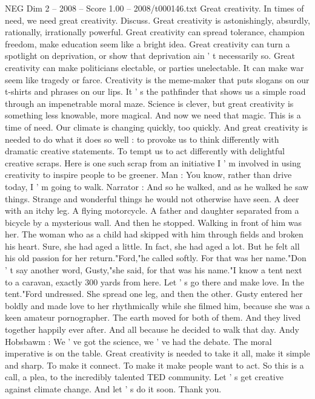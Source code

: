 \begin{textsample}{NEG Dim 2 – 2008 – Score 1.00 – 2008/t000146.txt}  \label{ex:f2_neg_023}
Great creativity.
In times of need, we need great creativity.
Discuss.
Great creativity is astonishingly, absurdly, rationally, irrationally powerful.
Great creativity can spread tolerance, champion freedom, make education seem like a bright idea.
Great creativity can turn a spotlight on deprivation, or show that deprivation ain ' t necessarily so.
Great creativity can make politicians electable, or parties unelectable.
It can make war seem like tragedy or farce.
Creativity is the meme-maker that puts slogans on our t-shirts and phrases on our lips.
It ' s the pathfinder that shows us a simple road through an impenetrable moral maze.
Science is clever, but great creativity is something less knowable, more magical.
And now we need that magic.
This is a time of need.
Our climate is changing quickly, too quickly.
And great creativity is needed to do what it does so well : to provoke us to think differently with dramatic creative statements.
To tempt us to act differently with delightful creative scraps.
Here is one such scrap from an initiative I ' m involved in using creativity to inspire people to be greener.
Man : You know, rather than drive today, I ' m going to walk.
Narrator : And so he walked, and as he walked he saw things.
Strange and wonderful things he would not otherwise have seen.
A deer with an itchy leg.
A flying motorcycle.
A father and daughter separated from a bicycle by a mysterious wall.
And then he stopped.
Walking in front of him was her.
The woman who as a child had skipped with him through fields and broken his heart.
Sure, she had aged a little.
In fact, she had aged a lot.
But he felt all his old passion for her return."Ford,"he called softly.
For that was her name."Don ' t say another word, Gusty,"she said, for that was his name."I know a tent next to a caravan, exactly 300 yards from here.
Let ' s go there and make love.
In the tent."Ford undressed.
She spread one leg, and then the other.
Gusty entered her boldly and made love to her rhythmically while she filmed him, because she was a keen amateur pornographer.
The earth moved for both of them.
And they lived together happily ever after.
And all because he decided to walk that day.
Andy Hobsbawm : We ' ve got the science, we ' ve had the debate.
The moral imperative is on the table.
Great creativity is needed to take it all, make it simple and sharp.
To make it connect.
To make it make people want to act.
So this is a call, a plea, to the incredibly talented TED community.
Let ' s get creative against climate change.
And let ' s do it soon.
Thank you.

\end{textsample}
